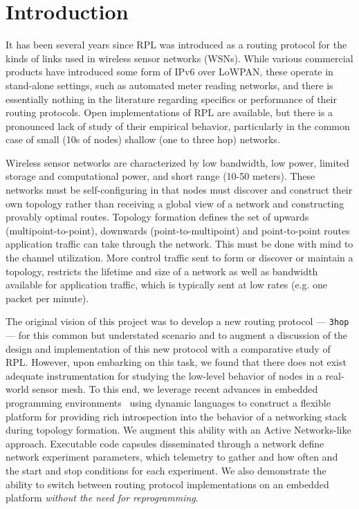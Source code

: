 \section{Introduction}

It has been several years since RPL was introduced as a routing protocol for the kinds of links used in wireless sensor networks (WSNs).
While various commercial products have introduced some form of IPv6 over LoWPAN, these operate in stand-alone settings, such as automated meter reading networks, and there is essentially nothing in the literature regarding specifics or performance of their routing protocols.
Open implementations of RPL are available, but there is a pronounced lack of study of their empirical behavior, particularly in the common case of small (10s of nodes) shallow (one to three hop) networks.

Wireless sensor networks are characterized by low bandwidth, low power, limited storage and computational power, and short range (10-50 meters).
These networks must be self-configuring in that nodes must discover and construct their own topology rather than receiving a global view of a network and constructing provably optimal routes.
Topology formation defines the set of upwards (multipoint-to-point), downwards (point-to-multipoint) and point-to-point routes application traffic can take through the network.
This must be done with mind to the channel utilization.
More control traffic sent to form or discover or maintain a topology, restricts the lifetime and size of a network as well as bandwidth available for application traffic, which is typically sent at low rates (e.g. one packet per minute).

The original vision of this project was to develop a new routing protocol --- \texttt{3hop} --- for this common but understated scenario and to augment a discussion of the design and implementation of this new protocol with a comparative study of RPL.
However, upon embarking on this task, we found that there does not exist adequate instrumentation for studying the low-level behavior of nodes in a real-world sensor mesh.
To this end, we leverage recent advances in embedded programming environments~\cite{andersen2016system} using dynamic languages to construct a flexible platform for providing rich introspection into the behavior of a networking stack during topology formation.
We augment this ability with an Active Networks-like approach.
Executable code capsules disseminated through a network define network experiment parameters, which telemetry to gather and how often and the start and stop conditions for each experiment.
We also demonstrate the ability to switch between routing protocol implementations on an embedded platform \emph{without the need for reprogramming}.

